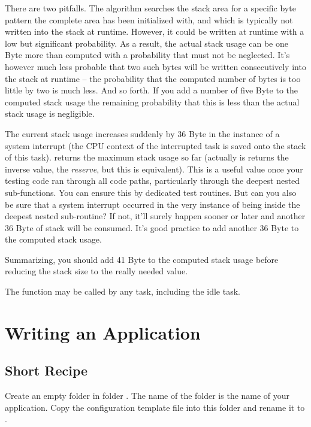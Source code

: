 There are two pitfalls. The algorithm searches the stack area for a
specific byte pattern the complete area has been initialized with, and
which is typically not written into the stack at runtime. However, it
could be written at runtime with a low but significant probability. As a
result, the actual stack usage can be one Byte more than computed with a
probability that must not be neglected. It's however much less probable
that two such bytes will be written consecutively into the stack at
runtime -- the probability that the computed number of bytes is too little
by two is much less. And so forth. If you add a number of five Byte to the
computed stack usage the remaining probability that this is less than the
actual stack usage is negligible.

The current stack usage increases suddenly by 36 Byte in the instance of a
system interrupt (the CPU context of the interrupted task is saved onto
the stack of this task).  returns the maximum
stack usage so far (actually is returns the inverse value, the
\emph{reserve}, but this is equivalent). This is a useful value once your
testing code ran through all code paths, particularly through the deepest
nested sub-functions. You can ensure this by dedicated test routines. But
can you also be sure that a system interrupt occurred in the very instance
of being inside the deepest nested sub-routine? If not, it'll surely
happen sooner or later and another 36 Byte of stack will be consumed. It's
good practice to add another 36 Byte to the computed stack usage.

Summarizing, you should add 41 Byte to the computed stack usage before
reducing the stack size to the really needed value.

The function  may be called by any task,
including the idle task.


\chapter{Writing an \rtos{} Application}
\label{secHowToWriteApp}

\section{Short Recipe}

Create an empty folder in folder .
The name of the folder is the name of your application. Copy the
configuration template file  into this folder and
rename it to .

